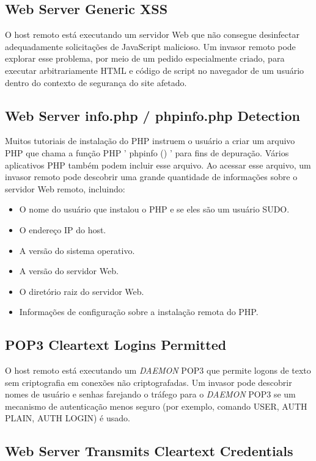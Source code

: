 \documentclass[
	12pt,				%
	openright,			%
	twoside,			%
	a4paper,			%
	english,			%
	french,				%
	spanish,			%
	brazil				%
	]{abntex2}
\begin{document}
	\subsection{Web Server Generic XSS}
	 O host remoto está executando um servidor Web que não consegue desinfectar adequadamente solicitações de JavaScript malicioso. Um invasor remoto pode explorar esse problema, por meio de um pedido especialmente criado, para executar arbitrariamente HTML e código de script no navegador de um usuário dentro do contexto de segurança do site afetado.

\subsection{Web Server info.php / phpinfo.php Detection}

	 Muitos tutoriais de instalação do PHP instruem o usuário a criar um arquivo PHP que chama a função PHP ' phpinfo () ' para fins de depuração. Vários aplicativos PHP também podem incluir esse arquivo.  Ao acessar esse arquivo, um invasor remoto pode descobrir uma grande quantidade de informações sobre o servidor Web remoto, incluindo:
	 \begin{itemize}
	 	\item O nome do usuário que instalou o PHP e se eles são um usuário SUDO.
	 	\item O endereço IP do host.
	 	\item A versão do sistema operativo.
	 	\item A versão do servidor Web.
	 	\item O diretório raiz do servidor Web.
	 	\item Informações de configuração sobre a instalação remota do PHP.
	 \end{itemize}

\subsection{POP3 Cleartext Logins Permitted}

 	O host remoto está executando um \textit{DAEMON} POP3 que permite logons de texto sem criptografia em conexões não criptografadas. Um invasor pode descobrir nomes de usuário e senhas farejando o tráfego para o \textit{DAEMON} POP3 se um mecanismo de autenticação menos seguro (por exemplo, comando USER, AUTH PLAIN, AUTH LOGIN) é usado.

\subsection{Web Server Transmits Cleartext Credentials}
\end{document}
